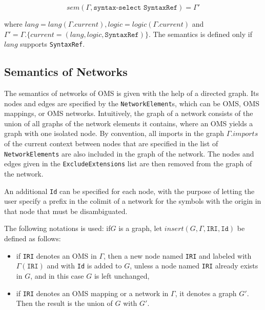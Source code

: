 \documentclass[10pt,fleqn,final]{scrreprt}
\newcommand{\cbs}[0]{\color{red}\xspace} %
\newcommand{\cbe}[0]{\color{black}\xspace} %
\newcommand*{\syntax}[1]{\texttt{#1}}
\newcommand{\semdom}[1]{
\begin{center}
\fbox{$#1$}
\end{center}
}
\newcommand{\current}{\mathit{current}}
\newcommand{\ssclause}[1]{\subsection{#1}}
\newenvironment{definitions}[0]{\medskip }{}
\begin{document}
\begin{definitions}
$$sem(\Gamma,\syntax{syntax-select SyntaxRef})=\Gamma'$$

\noindent where $lang = lang(\Gamma.\current), logic = logic(\Gamma.\current)$ and\\
$\Gamma'  = \Gamma.\{\current = (lang, logic, \syntax{SyntaxRef})\}$. 
The semantics is defined only if $\mathit{lang}$ supports \syntax{SyntaxRef}.

%

%

\ssclause{Semantics of Networks}

The semantics of networks of OMS is given with the help of a directed graph. Its nodes
and edges are specified by the \syntax{NetworkElement}s, which can be OMS, OMS mappings, or OMS networks. Intuitively, the graph of a
network consists of the union of all graphs of the network elements it
contains, where an OMS yields a graph with one isolated node.\cbs By convention,\cbe
all imports in the graph $\Gamma.imports$ of the current context between nodes that are
specified in the list of \syntax{NetworkElements} are also included in the graph of 
the network. 
The nodes and edges given in the \syntax{ExcludeExtensions} list are then removed from the graph of the network. 

An additional \syntax{Id} can be specified for each node, with the purpose of letting the user specify a 
prefix in the colimit of a network for the symbols with the origin in that node that must be disambiguated.

\cbs The following notations is used: if\cbe $G$ is a graph, let $insert(G, \Gamma, \syntax{IRI}, \syntax{Id})$ be defined as follows:
 \begin{itemize}
    \item if \syntax{IRI} denotes an OMS in $\Gamma$, then
                 a new node named \syntax{IRI} and labeled with $\Gamma(\syntax{IRI})$ and with \syntax{Id} is added to $G$,
                 unless a node named \syntax{IRI} already exists in $G$, and in this case $G$ is left unchanged,
   \item if \syntax{IRI} denotes an OMS mapping 
      or a network in $\Gamma$, it denotes a graph $G'$. Then
      the result is the union of $G$ with $G'$.
 \end{itemize}
 

\end{definitions}
\end{document}
